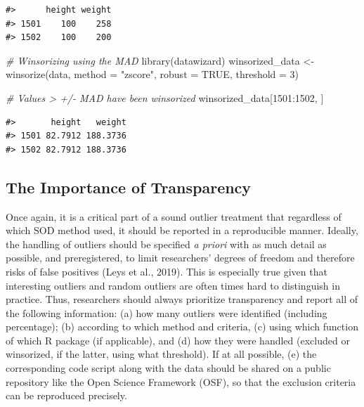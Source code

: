 \documentclass{article}
\newenvironment{Shaded}{\begin{snugshade}}{\end{snugshade}}
\newcommand{\AttributeTok}[1]{\textcolor[rgb]{0.77,0.63,0.00}{#1}}
\newcommand{\CommentTok}[1]{\textcolor[rgb]{0.56,0.35,0.01}{\textit{#1}}}
\newcommand{\ConstantTok}[1]{\textcolor[rgb]{0.00,0.00,0.00}{#1}}
\newcommand{\DecValTok}[1]{\textcolor[rgb]{0.00,0.00,0.81}{#1}}
\newcommand{\FunctionTok}[1]{\textcolor[rgb]{0.00,0.00,0.00}{#1}}
\newcommand{\NormalTok}[1]{#1}
\newcommand{\OtherTok}[1]{\textcolor[rgb]{0.56,0.35,0.01}{#1}}
\newcommand{\SpecialCharTok}[1]{\textcolor[rgb]{0.00,0.00,0.00}{#1}}
\newcommand{\StringTok}[1]{\textcolor[rgb]{0.31,0.60,0.02}{#1}}
\begin{document}
\begin{verbatim}
#>      height weight
#> 1501    100    258
#> 1502    100    200
\end{verbatim}

\begin{Shaded}
\begin{Highlighting}[]
\CommentTok{\# Winsorizing using the MAD}
\FunctionTok{library}\NormalTok{(datawizard)}
\NormalTok{winsorized\_data }\OtherTok{\textless{}{-}} \FunctionTok{winsorize}\NormalTok{(data, }\AttributeTok{method =} \StringTok{"zscore"}\NormalTok{, }\AttributeTok{robust =} \ConstantTok{TRUE}\NormalTok{, }\AttributeTok{threshold =} \DecValTok{3}\NormalTok{)}

\CommentTok{\# Values \textgreater{} +/{-} MAD have been winsorized}
\NormalTok{winsorized\_data[}\DecValTok{1501}\SpecialCharTok{:}\DecValTok{1502}\NormalTok{, ]}
\end{Highlighting}
\end{Shaded}

\begin{verbatim}
#>       height   weight
#> 1501 82.7912 188.3736
#> 1502 82.7912 188.3736
\end{verbatim}

\hypertarget{the-importance-of-transparency}{%
\subsection{The Importance of
Transparency}\label{the-importance-of-transparency}}

Once again, it is a critical part of a sound outlier treatment that
regardless of which SOD method used, it should be reported in a
reproducible manner. Ideally, the handling of outliers should be
specified \emph{a priori} with as much detail as possible, and
preregistered, to limit researchers' degrees of freedom and therefore
risks of false positives (Leys et al., 2019). This is especially true
given that interesting outliers and random outliers are often times hard
to distinguish in practice. Thus, researchers should always prioritize
transparency and report all of the following information: (a) how many
outliers were identified (including percentage); (b) according to which
method and criteria, (c) using which function of which R package (if
applicable), and (d) how they were handled (excluded or winsorized, if
the latter, using what threshold). If at all possible, (e) the
corresponding code script along with the data should be shared on a
public repository like the Open Science Framework (OSF), so that the
exclusion criteria can be reproduced precisely.
\end{document}
